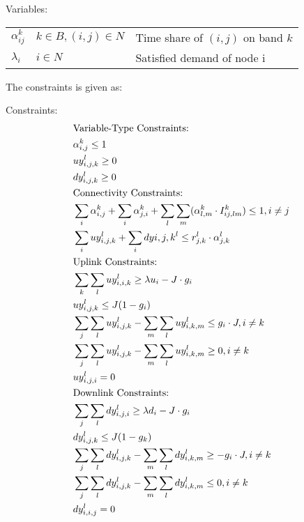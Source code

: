 \vspace{2pt}
Variables:
\vspace{1pt}
\begin{tabular}{llp{3cm}}
$\alpha_{ij}^k$ & $k\in B, (i,j) \in N$ & 
Time share of $(i,j)$ on band $k$\\ 
$\lambda_{i}$ & $i \in N$ & 
Satisfied demand of node i\\ 
\end{tabular}

\vspace{3pt}
The constraints is given as:

\vspace{1pt}


Constraints:
\begin{align}
& \text{Variable-Type Constraints:}\notag \\
& \alpha _{i,j}^k \leq 1 \\
& uy_{i,j,k}^l \geq 0 \\
& dy_{i,j,k}^l \geq 0 \\
& \text{Connectivity Constraints:} \notag \\
\label{opt:1}
& \sum_i \alpha_{i,j}^k + \sum_i \alpha_{j,i}^k + \sum_l\sum_m(\alpha_{l,m}^k \cdot I_{ij,lm}^k) \leq 1, i\neq j \\
\label{opt:2}
& \sum_i uy_{i,j,k}^l + \sum_i dy{i,j,k}^l \leq r_{j,k}^l \cdot \alpha_{j,k}^l \\
& \text{Uplink Constraints:}\notag \\
\label{opt:3}
& \sum_k \sum_l uy_{i,i,k}^l \geq \lambda u_i - J\cdot g_i \\
\label{opt:4}
& uy_{i,j,k}^l \leq J(1-g_i) \\
\label{opt:5}
& \sum_j\sum_l uy_{i,j,k}^l - \sum_m\sum_l uy_{i,k,m}^l \leq g_i \cdot J , i \neq k\\
\label{opt:6}
& \sum_j\sum_l uy_{i,j,k}^l - \sum_m \sum_l uy_{i,k,m}^l \geq 0, i \neq k\\
\label{opt:7}
& uy_{i,j,i}^l=0\\
& \text{Downlink Constraints:}\notag \\
\label{opt:8}
& \sum_j \sum_l dy_{i,j,i}^l \geq \lambda d_i - J\cdot g_i \\
\label{opt:9}
& dy_{i,j,k}^l \leq J(1-g_k) \\
\label{opt:10}
& \sum_j\sum_l dy_{i,j,k}^l - \sum_m\sum_l dy_{i,k,m}^l \geq -g_i \cdot J, i \neq k\\
\label{opt:11}
& \sum_j\sum_l dy_{i,j,k}^l - \sum_m \sum_l dy_{i,k,m}^l \leq 0, i \neq k\\
\label{opt:12}
& dy_{i,i,j}^l=0
\end{align}

